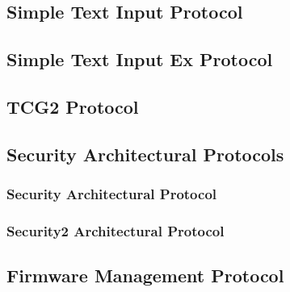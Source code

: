 \clearpage

\subsection{Simple Text Input Protocol}


\clearpage

\subsection{Simple Text Input Ex Protocol}


\clearpage

\subsection{\acs{TCG}2 Protocol}


\clearpage

\subsection{Security Architectural Protocols}
\label{sec:appendix:protocols:security:architectual:protocols}

\subsubsection{Security Architectural Protocol}


\subsubsection{Security2 Architectural Protocol}


\clearpage

\subsection{Firmware Management Protocol}


